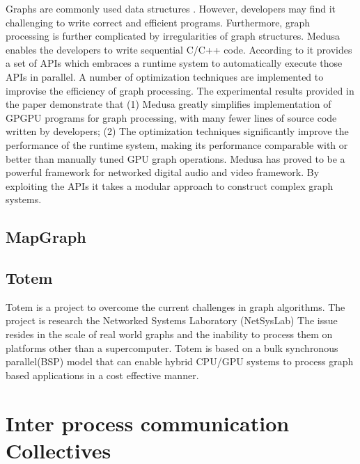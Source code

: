      Graphs are commonly used data structures . However, developers
     may find it challenging to write correct and efficient
     programs. Furthermore, graph processing is further complicated by
     irregularities of graph structures. Medusa enables the developers
     to write sequential C/C++ code. According to \cite{paper_medusa}
     it provides a set of APIs which embraces a runtime system to
     automatically execute those APIs in parallel. A number of
     optimization techniques are implemented to improvise the
     efficiency of graph processing. The experimental results provided
     in the paper \cite{paper_medusa} demonstrate that (1) Medusa
     greatly simplifies implementation of GPGPU programs for graph
     processing, with many fewer lines of source code written by
     developers; (2) The optimization techniques significantly improve
     the performance of the runtime system, making its performance
     comparable with or better than manually tuned GPU graph
     operations. \cite{www-medusa} Medusa has proved to be a powerful
     framework for networked digital audio and video
     framework. \cite{www-medusa} By exploiting the APIs it takes a
     modular approach to construct complex graph systems. 

\subsection{MapGraph}
\subsection{Totem}

     Totem is a project to overcome the current challenges in graph 
     algorithms.  The project is research the Networked Systems
     Laboratory (NetSysLab) The issue resides in the scale of real 
     world graphs and the inability to process them on platforms
     other than a supercomputer.  Totem is based on a bulk synchronous 
     parallel(BSP) model that can enable hybrid CPU/GPU systems to process 
     graph based applications in a cost effective manner. 
     \cite{www-netsyslab}


\section{Inter process communication Collectives}
\label{S:o-process-communication}


